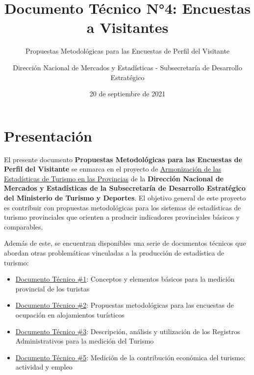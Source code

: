 \documentclass[
]{book}
\title{Documento Técnico N°4: Encuestas a Visitantes}
\subtitle{Propuestas Metodológicas para las Encuestas de Perfil del Visitante}
\author{Dirección Nacional de Mercados y Estadísticas - Subsecretaría de Desarrollo Estratégico}
\date{20 de septiembre de 2021}
\let\oldmaketitle\maketitle
\begin{document}
\maketitle


\newpage

\let\maketitle\oldmaketitle
\maketitle

{
\setcounter{tocdepth}{1}
\tableofcontents
}
\hypertarget{presentaciuxf3n}{%
\chapter*{\texorpdfstring{\textbf{Presentación}}{Presentación}}\label{presentaciuxf3n}}

El presente documento \textbf{Propuestas Metodológicas para las Encuestas de Perfil del Visitante} se enmarca en el proyecto de \href{https://armonizacion.yvera.tur.ar//}{Armonización de las Estadísticas de Turismo en las Provincias} de la \textbf{Dirección Nacional de Mercados y Estadísticas de la Subsecretaría de Desarrollo Estratégico del Ministerio de Turismo y Deportes}. El objetivo general de este proyecto es contribuir con propuestas metodológicas para los sistemas de estadísticas de turismo provinciales que orienten a producir indicadores provinciales básicos y comparables.

Además de este, se encuentran disponibles una serie de documentos técnicos que abordan otras problemáticas vinculadas a la producción de estadística de turismo:

\begin{itemize}
\item
  \href{https://dnme-minturdep.github.io/DT1_medicion_turismo/}{Documento Técnico \#1}: Conceptos y elementos básicos para la medición provincial de los turistas
\item
  \href{https://dnme-minturdep.github.io/DT2_encuestas/}{Documento Técnico \#2}: Propuestas metodológicas para las encuestas de ocupación en alojamientos turísticos
\item
  \href{https://dnme-minturdep.github.io/DT3_registros_adminsitrativos/}{Documento Técnico \#3}: Descripción, análisis y utilización de los Registros Administrativos para la medición del Turismo
\item
  \href{https://dnme-minturdep.github.io/DT5_actividad_empleo/}{Documento Técnico \#5}: Medición de la contribución económica del turismo: actividad y empleo
\end{itemize}
\end{document}
